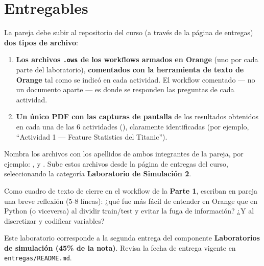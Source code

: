 \documentclass[11pt,letterpaper]{article}
\newcommand{\faPencil}{\raisebox{-0.1em}{\textbf{\Large\textbullet}}}
\begin{document}
\section{Entregables}

La pareja debe subir al repositorio del curso (a través de la página de entregas) \textbf{dos tipos de archivo}:

\begin{enumerate}[leftmargin=1.2cm]
  \item \textbf{Los archivos \texttt{.ows} de los workflows armados en Orange} (uno por cada parte del laboratorio), \textbf{comentados con la herramienta de texto de Orange} tal como se indicó en cada actividad. El workflow comentado --- no un documento aparte --- es donde se responden las preguntas de cada actividad.
  \item \textbf{Un único PDF con las capturas de pantalla} de los resultados obtenidos en cada una de las 6 actividades (\faPencil), claramente identificadas (por ejemplo, ``Actividad 1 --- Feature Statistics del Titanic'').
\end{enumerate}

Nombra los archivos con los apellidos de ambos integrantes de la pareja, por ejemplo: \texttt{}, \texttt{} y \texttt{}. Sube estos archivos desde la página de entregas del curso, seleccionando la categoría \textbf{Laboratorio de Simulación 2}.

\begin{actividad}[title={\faPencil\ Reflexión final}]
Como cuadro de texto de cierre en el workflow de la \textbf{Parte 1}, escriban en pareja una breve reflexión (5-8 líneas): ¿qué fue más fácil de entender en Orange que en Python (o viceversa) al dividir train/test y evitar la fuga de información? ¿Y al discretizar y codificar variables?
\end{actividad}

\begin{nota}
Este laboratorio corresponde a la segunda entrega del componente \textbf{Laboratorios de simulación (45\% de la nota)}. Revisa la fecha de entrega vigente en \texttt{entregas/README.md}.
\end{nota}
\end{document}
